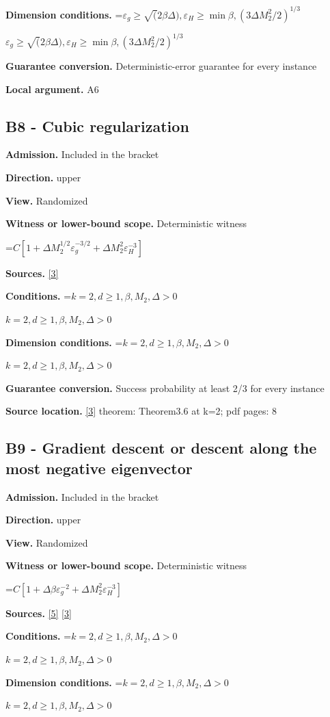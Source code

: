 \documentclass[10pt,a4paper]{article}
\newcommand{\AtlasMath}[1]{\par\begingroup\centering\setbox0=\hbox{$\displaystyle #1$}\ifdim\wd0>1.4\linewidth\typeout{ATLAS WIDE FORMULA: \the\wd0}\fi\ifdim\wd0>\linewidth\resizebox{\linewidth}{!}{\box0}\else\box0\fi\par\endgroup}
\newcommand{\AtlasInlineMath}[1]{\begingroup\setbox0=\hbox{$#1$}\ifdim\wd0>.4\linewidth\endgroup\AtlasMath{#1}\else\endgroup$#1$\fi}
\begin{document}
\textbf{Dimension conditions.} \AtlasInlineMath{\varepsilon_g\ge \sqrt(2\beta\Delta), \varepsilon_H\ge \min{\beta,(3\Delta M_2^2/2)^{1/3}}}

\textbf{Guarantee conversion.} Deterministic-error guarantee for every instance

\textbf{Local argument.} A6

\subsection{B8 - Cubic regularization}
\textbf{Admission.} Included in the bracket

\textbf{Direction.} upper

\textbf{View.} Randomized

\textbf{Witness or lower-bound scope.} Deterministic witness

\AtlasMath{C[1+\Delta M_2^{1/2}\varepsilon_g^{-3/2}+\Delta M_2^2\varepsilon_H^{-3}]}
\textbf{Sources.} \href{https://arxiv.org/abs/1708.04044}{[3]}

\textbf{Conditions.} \AtlasInlineMath{k=2,d\ge 1,\beta,M_2,\Delta>0}

\textbf{Dimension conditions.} \AtlasInlineMath{k=2,d\ge 1,\beta,M_2,\Delta>0}

\textbf{Guarantee conversion.} Success probability at least 2/3 for every instance

\textbf{Source location.} \href{https://arxiv.org/abs/1708.04044}{[3]} theorem: Theorem3.6 at k=2; pdf pages: 8

\subsection{B9 - Gradient descent or descent along the most negative eigenvector}
\textbf{Admission.} Included in the bracket

\textbf{Direction.} upper

\textbf{View.} Randomized

\textbf{Witness or lower-bound scope.} Deterministic witness

\AtlasMath{C[1+\Delta\beta\varepsilon_g^{-2}+\Delta M_2^2\varepsilon_H^{-3}]}
\textbf{Sources.} \href{https://optimization-online.org/wp-content/uploads/2015/06/4970.pdf}{[5]} \href{https://arxiv.org/abs/1708.04044}{[3]}

\textbf{Conditions.} \AtlasInlineMath{k=2,d\ge 1,\beta,M_2,\Delta>0}

\textbf{Dimension conditions.} \AtlasInlineMath{k=2,d\ge 1,\beta,M_2,\Delta>0}
\end{document}
